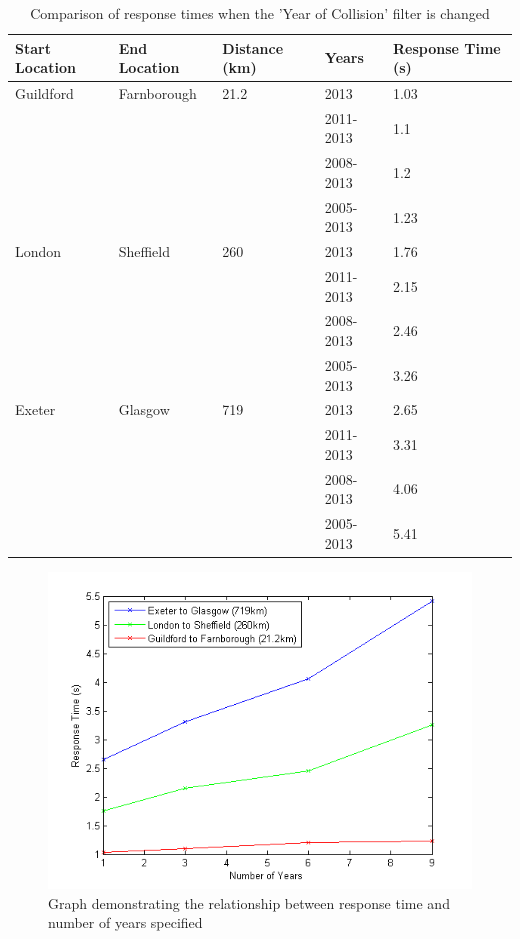 \documentclass[authoryearcitations]{UoYCSproject}
\begin{document}
\begin{table}
	\center
	\caption{Comparison of response times when the 'Year of Collision' filter is changed}
	\label{tab:performanceresults2}
	\begin{tabular}{| l | l | l | l | l |}
	\hline
	\textbf{Start Location} & \textbf{End Location} & \textbf{Distance (km)} & \textbf{Years} & \textbf{Response Time (s)} \\ \hline
	Guildford & Farnborough &  21.2 & 2013 & 1.03 \\ \hline
	 &  &  & 2011-2013 & 1.1 \\ \hline
	 &  &  & 2008-2013 & 1.2 \\ \hline
	 &  &  & 2005-2013 & 1.23 \\ \hline
	 London & Sheffield &  260 & 2013 & 1.76 \\ \hline
	 &  &  & 2011-2013 & 2.15 \\ \hline
	 &  &  & 2008-2013 & 2.46 \\ \hline
	 &  &  & 2005-2013 & 3.26 \\ \hline
	 Exeter & Glasgow &  719 & 2013 & 2.65 \\ \hline
	 &  &  & 2011-2013 & 3.31 \\ \hline
	 &  &  & 2008-2013 & 4.06 \\ \hline
	 &  &  & 2005-2013 & 5.41 \\ \hline
	\end{tabular}
\end{table}

\begin{figure}
	\center
	\includegraphics[scale=1]{performance-years}
	\caption{Graph demonstrating the relationship between response time and number of years specified}
	\label{fig:graphrespyears}
\end{figure}
\end{document}
